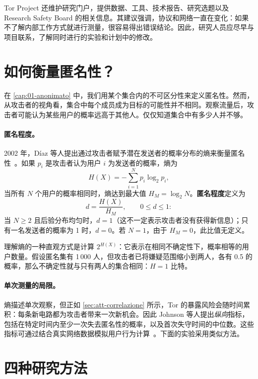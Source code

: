 Tor Project 还维护研究门户，提供数据、工具、技术报告、研究选题以及 Research Safety Board 的相关信息。其建议强调，协议和网络一直在变化：如果不了解内部工作方式就进行测量，很容易得出错误结论。因此，研究人员应尽早与项目联系，了解同时进行的实验和计划中的修改。

\section{如何衡量匿名性？}\label{sec:ric-metriche}

在 \cref{cap:01-anonimato} 中，我们用某个集合内的不可区分性来定义匿名性。然而，从攻击者的视角看，集合中每个成员成为目标的可能性并不相同。观察流量后，攻击者可能认为某些用户的概率远高于其他人。仅仅知道集合中有多少人并不够。

\paragraph{匿名程度。}2002 年，Díaz 等人提出通过攻击者赋予潜在发送者的概率分布的熵来衡量匿名性~\cite{diaz2002measuring}。如果 $p_i$ 是攻击者认为用户 $i$ 为发送者的概率，熵为
\[ H(X) = -\sum_{i=1}^{N} p_i \log_2 p_i, \]
当所有 $N$ 个用户的概率相同时，熵达到最大值 $H_M = \log_2 N$。\textbf{匿名程度}定义为
\[ d = \frac{H(X)}{H_M}, \qquad 0 \le d \le 1: \]
当 $N\ge 2$ 且后验分布均匀时，$d=1$（这不一定表示攻击者没有获得新信息）；只有一名发送者的概率为 1 时，$d=0$。若 $N=1$，由于 $H_M=0$，此比值无定义。

理解熵的一种直观方式是计算 $2^{H(X)}$：它表示在相同不确定性下，概率相等的用户数量。假设匿名集有 1\,000 人，但攻击者已将嫌疑范围缩小到两人，各有 0.5 的概率，那么不确定性就与只有两人的集合相同：$H=1$ 比特。

\paragraph{单次测量的局限。}熵描述单次观察，但正如 \cref{sec:att-correlazione} 所示，Tor 的暴露风险会随时间累积：每条新电路都为攻击者带来一次新机会。因此 Johnson 等人提出\emph{纵向}指标，包括在特定时间内至少一次失去匿名性的概率，以及首次失守时间的中位数。这些指标可通过结合真实网络数据模拟用户行为计算~\cite{johnson2013users}。下面的实验采用类似方法。

\section{四种研究方法}\label{sec:ric-metodi}

